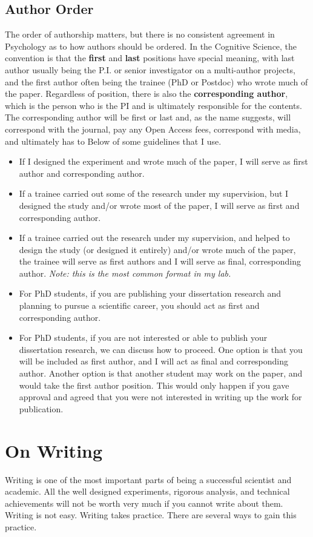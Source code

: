 \documentclass{article}
\begin{document}
\subsection{Author Order} The order of authorship matters, but there is no consistent agreement in Psychology as to how authors should be ordered. In the Cognitive Science, the convention is that the \textbf{first} and \textbf{last} positions have special meaning, with last author usually being the P.I. or senior investigator on a multi-author projects, and the first author often being the trainee (PhD or Postdoc) who wrote much of the paper. Regardless of position, there is also the \textbf{corresponding author}, which is the person who is the PI and is ultimately responsible for the contents. The corresponding author will  be first or last and, as the name suggests, will correspond with the journal, pay any Open Access fees, correspond with media, and ultimately has to Below of some guidelines that I use.
\begin{itemize}
\item If I designed the experiment and wrote much of the paper, I will serve as first author and corresponding author. 
\item If a trainee carried out some of the research under my supervision, but I designed the study and/or wrote most of the paper, I will serve as first and corresponding author.
\item If a trainee carried out the research under my supervision, and helped to design the study (or designed it entirely) and/or wrote much of the paper, the trainee will serve as first authors and I will serve as final, corresponding author. \textit{Note: this is the most common format in my lab.}
\item For PhD students, if you are publishing your dissertation research and planning to pursue a scientific career, you should act as first and corresponding author. 
\item For PhD students, if you are not interested or able to publish your dissertation research, we can discuss how to proceed. One option is that you will be included as first author, and I will act as final and corresponding author. Another option is that another student may work on the paper, and would take the first author position. This would only happen if you gave approval and agreed that you were not interested in writing up the work for publication. 
\end{itemize}

\section{On Writing}
Writing is one of the most important parts of being a successful scientist and academic. All the well designed experiments, rigorous analysis, and technical achievements will not be worth very much if you cannot write about  them.  Writing is not easy. Writing takes practice. There are several ways to gain this practice.
\end{document}
